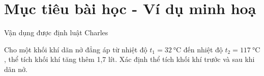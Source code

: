 \section{Mục tiêu bài học - Ví dụ minh hoạ}
\begin{dang}{Vận dụng được định luật Charles}
	{Cho một khối khí dãn nở đẳng áp từ nhiệt độ $t_1=\SI{32}{\celsius}$ đến nhiệt độ $t_2=\SI{117}{\celsius}$, thể tích khối khí tăng thêm 1,7 lít. Xác định thể tích khối khí trước và sau khi dãn nở.
	
}
{}


\end{dang}
